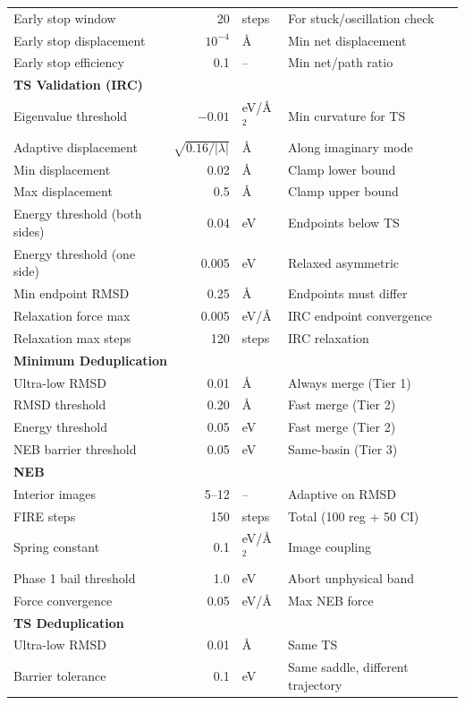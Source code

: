 \documentclass[11pt,a4paper]{article}
\begin{document}
\begin{longtable}{p{5cm}rlp{6cm}}
Early stop window & 20 & steps & For stuck/oscillation check \\
Early stop displacement & $10^{-4}$ & \AA & Min net displacement \\
Early stop efficiency & 0.1 & -- & Min net/path ratio \\
\midrule
\multicolumn{4}{l}{\textbf{TS Validation (IRC)}} \\
\midrule
Eigenvalue threshold & $-0.01$ & eV/\AA$^2$ & Min curvature for TS \\
Adaptive displacement & $\sqrt{0.16/|\lambda|}$ & \AA & Along imaginary mode \\
Min displacement & 0.02 & \AA & Clamp lower bound \\
Max displacement & 0.5 & \AA & Clamp upper bound \\
Energy threshold (both sides) & 0.04 & eV & Endpoints below TS \\
Energy threshold (one side) & 0.005 & eV & Relaxed asymmetric \\
Min endpoint RMSD & 0.25 & \AA & Endpoints must differ \\
Relaxation force max & 0.005 & eV/\AA & IRC endpoint convergence \\
Relaxation max steps & 120 & steps & IRC relaxation \\
\midrule
\multicolumn{4}{l}{\textbf{Minimum Deduplication}} \\
\midrule
Ultra-low RMSD & 0.01 & \AA & Always merge (Tier 1) \\
RMSD threshold & 0.20 & \AA & Fast merge (Tier 2) \\
Energy threshold & 0.05 & eV & Fast merge (Tier 2) \\
NEB barrier threshold & 0.05 & eV & Same-basin (Tier 3) \\
\midrule
\multicolumn{4}{l}{\textbf{NEB}} \\
\midrule
Interior images & 5--12 & -- & Adaptive on RMSD \\
FIRE steps & 150 & steps & Total (100 reg + 50 CI) \\
Spring constant & 0.1 & eV/\AA$^2$ & Image coupling \\
Phase 1 bail threshold & 1.0 & eV & Abort unphysical band \\
Force convergence & 0.05 & eV/\AA & Max NEB force \\
\midrule
\multicolumn{4}{l}{\textbf{TS Deduplication}} \\
\midrule
Ultra-low RMSD & 0.01 & \AA & Same TS \\
Barrier tolerance & 0.1 & eV & Same saddle, different trajectory \\

\end{longtable}
\end{document}
